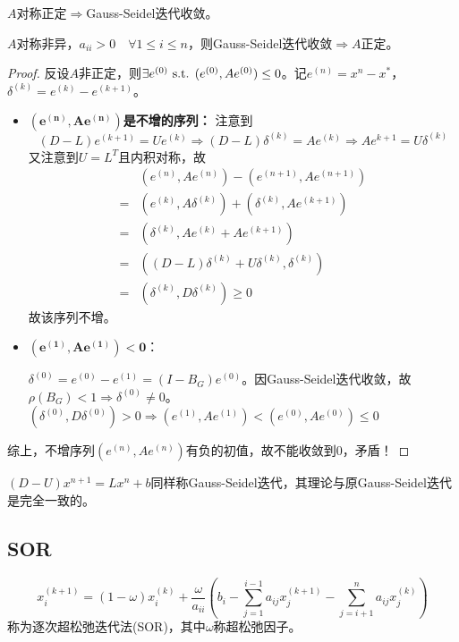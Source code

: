 \documentclass{ctexart}
\begin{document}
\begin{Thm}
$A$对称正定$\Rightarrow$Gauss-Seidel迭代收敛。
\end{Thm}

\begin{Thm}
$A$对称非异，$a_{ii}>0\quad\forall 1\leq i\leq n$，则Gauss-Seidel迭代收敛$\Rightarrow A$正定。
\end{Thm}
\begin{proof}
反设$A$非正定，则$\exists e^{(0)}\text{ s.t. } (e^{(0)},Ae^{(0)})\leq 0$。记$e^{(n)}=x^n-x^*$，$\delta^{(k)}=e^{(k)}-e^{(k+1)}$。


\begin{itemize}
\item $\bm{(e^{(n)},Ae^{(n)})}$\textbf{是不增的序列：}
注意到
\[(D-L)e^{(k+1)}=Ue^{(k)}\Rightarrow (D-L)\delta^{(k)}=Ae^{(k)}\Rightarrow Ae^{k+1}=U\delta^{(k)}\]
又注意到$U=L^T$且内积对称，故
\begin{align*}
&(e^{(n)},Ae^{(n)})-(e^{(n+1)},Ae^{(n+1)})\\
=&(e^{(k)},A\delta^{(k)})+(\delta^{(k)},Ae^{(k+1)})\\
=&(\delta^{(k)},Ae^{(k)}+Ae^{(k+1)})\\
=&((D-L)\delta^{(k)}+U\delta^{(k)},\delta^{(k)})\\
=&(\delta^{(k)},D\delta^{(k)})\geq 0
\end{align*}
故该序列不增。

\item $\bm{(e^{(1)},Ae^{(1)})<0}$：

$\delta^{(0)}=e^{(0)}-e^{(1)}=(I-B_G)e^{(0)}$。因Gauss-Seidel迭代收敛，故$\rho(B_G)<1\Rightarrow \delta^{(0)}\neq 0$。$(\delta^{(0)},D\delta^{(0)})>0\Rightarrow (e^{(1)},Ae^{(1)})<(e^{(0)},Ae^{(0)})\leq 0$
\end{itemize}
综上，不增序列$(e^{(n)},Ae^{(n)})$有负的初值，故不能收敛到0，矛盾！
\end{proof}

$(D-U)x^{n+1}=Lx^{n}+b$同样称Gauss-Seidel迭代，其理论与原Gauss-Seidel迭代是完全一致的。

\subsection{SOR}
\begin{Def}
\[x_i^{(k+1)}=(1-\omega)x_i^{(k)}+\frac{\omega}{a_{ii}}(b_i-\sum\limits_{j=1}^{i-1}a_{ij}x_j^{(k+1)}-\sum_{j=i+1}^na_{ij}x_j^{(k)})\]
称为逐次超松弛迭代法(SOR)，其中$\omega$称超松弛因子。
\end{Def}
\end{document}
